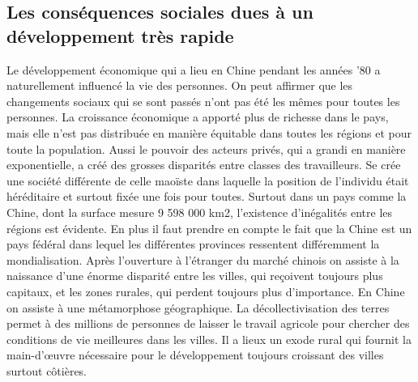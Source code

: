 \subsection{Les conséquences sociales dues à un développement très rapide}
Le développement économique qui a lieu en Chine pendant les années ’80 a naturellement influencé la vie des personnes. On peut affirmer que les changements sociaux qui se sont passés n’ont pas été les mêmes pour toutes les personnes. La croissance économique a apporté plus de richesse dans le pays, mais elle n’est pas distribuée en manière équitable dans toutes les régions et pour toute la population.  Aussi le pouvoir des acteurs privés, qui a grandi en manière exponentielle, a créé des grosses disparités entre classes des travailleurs. Se crée une société différente de celle maoïste dans laquelle la position de l'individu était héréditaire et surtout fixée une fois pour toutes. 
Surtout dans un pays comme la Chine, dont la surface mesure 9 598 000 km2, l'existence d'inégalités entre les régions est évidente.   En plus il faut prendre en compte le fait que la Chine est un pays fédéral dans lequel les différentes provinces ressentent différemment la mondialisation.  Après l’ouverture à l’étranger du marché chinois on assiste à la naissance d’une énorme disparité entre les villes, qui reçoivent toujours plus capitaux, et les zones rurales, qui perdent toujours plus d’importance.  En Chine on assiste à une métamorphose géographique. La décollectivisation des terres permet à des millions de personnes de laisser le travail agricole pour chercher des conditions de vie meilleures dans les villes. Il a lieux un exode rural qui fournit la main-d’œuvre nécessaire pour le développement toujours croissant des villes surtout côtières. 

